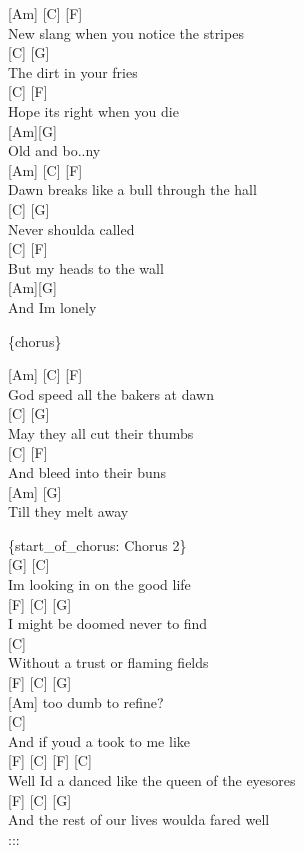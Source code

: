 \documentclass[
  letterpaper,
]{scrbook}
\begin{document}
{[}Am{]} {[}C{]} {[}F{]}\\
New slang when you notice the stripes\\
{[}C{]} {[}G{]}\\
The dirt in your fries\\
{[}C{]} {[}F{]}\\
Hope it\textquotesingle s right when you die\\
{[}Am{]}{[}G{]}\\
Old and bo..ny\\
{[}Am{]} {[}C{]} {[}F{]}\\
Dawn breaks like a bull through the hall\\
{[}C{]} {[}G{]}\\
Never should\textquotesingle a called\\
{[}C{]} {[}F{]}\\
But my heads to the wall\\
{[}Am{]}{[}G{]}\\
And I\textquotesingle m lonely

\{chorus\}

{[}Am{]} {[}C{]} {[}F{]}\\
God speed all the baker\textquotesingle s at dawn\\
{[}C{]} {[}G{]}\\
May they all cut their thumbs\\
{[}C{]} {[}F{]}\\
And bleed into their buns\\
{[}Am{]} {[}G{]}\\
\textquotesingle Till they melt away

\{start\_of\_chorus: Chorus 2\}\\
{[}G{]} {[}C{]}\\
I\textquotesingle m looking in on the good life\\
{[}F{]} {[}C{]} {[}G{]}\\
I might be doomed never to find\\
{[}C{]}\\
Without a trust or flaming fields\\
{[}F{]} {[}C{]} {[}G{]}\\
{[}Am{]} too dumb to refine?\\
{[}C{]}\\
And if you\textquotesingle d a took to me like\\
{[}F{]} {[}C{]} {[}F{]} {[}C{]}\\
Well I\textquotesingle d a danced like the queen of the eyesores\\
{[}F{]} {[}C{]} {[}G{]}\\
And the rest of our lives would\textquotesingle a fared well\\
:::
\end{document}
